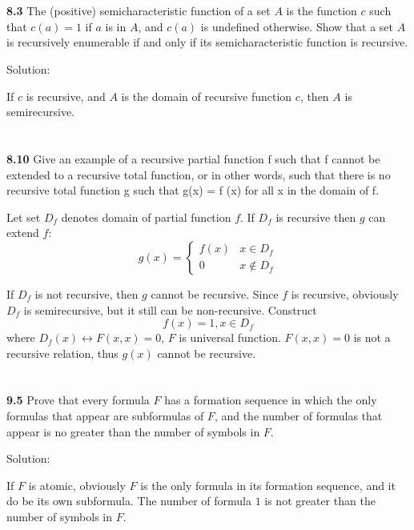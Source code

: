 \documentclass{ctexart}
\begin{document}
\section*{}

\textbf{8.3} The (positive) semicharacteristic function of a set $A$ is the function $c$ such
that $c(a) = 1$ if $a$ is in $A$, and $c(a)$ is undefined otherwise. Show that a set $A$ is
recursively enumerable if and only if its semicharacteristic function is recursive.

Solution:

If $c$ is recursive, and $A$ is the domain of recursive function $c$, then $A$ is semirecursive.

\section*{}

\textbf{8.10} Give an example of a recursive partial function f such that f
cannot be extended to a recursive total function, or in other words, such that there is no
recursive total function g such that g(x) = f (x) for all x in the domain of f.

Let set $D_f$ denotes domain of partial function $f$. If $D_f$ is recursive
then $g$ can extend $f$:
$$
g(x) = \begin{cases}
	f(x) & x \in D_f \\
	0 & x \not\in D_f
\end{cases}
$$

If $D_f$ is not recursive, then $g$ cannot be recursive. Since $f$ is recursive,
obviously $D_f$ is semirecursive, but it still can be non-recursive. Construct
$$
f(x) = 1, x \in D_f
$$
where $D_f(x) \leftrightarrow F(x, x) = 0$, $F$ is universal function. $F(x, x) = 0$ is not a
recursive relation, thus $g(x)$ cannot be recursive.

\section*{}

\textbf{9.5} Prove that every formula $F$ has a formation sequence in which the only formulas
that appear are subformulas of $F$, and the number of formulas that appear is no greater than
the number of symbols in $F$.

Solution:

If $F$ is atomic, obviously $F$ is the only formula in its formation sequence,
and it do be its own subformula. The number of formula $1$ is not greater than
the number of symbols in $F$.
\end{document}
